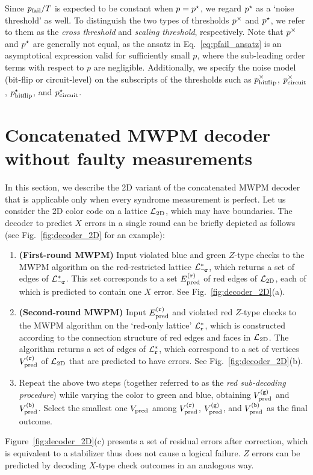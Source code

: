 \documentclass[a4paper,twocolumn,11pt,accepted=2025-01-21]{quantumarticle}
\theoremstyle{definition}
\theoremstyle{definition}
\theoremstyle{definition}
\begin{document}
Since $p_{\mathrm{fail}}/T$ is expected to be constant when $p = p^\star_{\mathrm{}}$, we regard $p^\star_{\mathrm{}}$ as a `noise threshold' as well.
To distinguish the two types of thresholds $p^\times_{\mathrm{}}$ and $p^\star_{\mathrm{}}$, we refer to them as the \emph{cross threshold} and \emph{scaling threshold}, respectively.
Note that $p^\times_{\mathrm{}}$ and $p^\star_{\mathrm{}}$ are generally not equal, as the ansatz in Eq.~\eqref{eq:pfail_ansatz} is an asymptotical expression valid for sufficiently small $p$, where the sub-leading order terms with respect to $p$ are negligible.
Additionally, we specify the noise model (bit-flip or circuit-level) on the subscripts of the thresholds such as $p^\times_{\mathrm{bitflip}}$, $p^\times_{\mathrm{circuit}}$, $p^\star_{\mathrm{bitflip}}$, and $p^\star_{\mathrm{circuit}}$.

\section{Concatenated MWPM decoder without faulty measurements \label{sec:decoder_bit_flip}}

In this section, we describe the 2D variant of the concatenated MWPM decoder that is applicable only when every syndrome measurement is perfect.
Let us consider the 2D color code on a lattice $\mathcal{L}_{\mathrm{2D}}$, which may have boundaries.
The decoder to predict $X$ errors in a single round can be briefly depicted as follows (see Fig.~\ref{fig:decoder_2D} for an example):
\begin{enumerate}
    \item \textbf{(First-round MWPM)} Input violated blue and green $Z$-type checks to the MWPM algorithm on the red-restricted lattice $\mathcal{L}_{\neg \texttt{r}}^*$, which returns a set of edges of $\mathcal{L}_{\neg \texttt{r}}^*$. 
    This set corresponds to a set $E_{\mathrm{pred}}^{(\texttt{r})}$ of red edges of $\mathcal{L}_{\mathrm{2D}}$, each of which is predicted to contain one $X$ error. 
    See Fig.~\ref{fig:decoder_2D}(a).
    \item \textbf{(Second-round MWPM)} Input $E_{\mathrm{pred}}^{(\texttt{r})}$ and violated red $Z$-type checks to the MWPM algorithm on the `red-only lattice' $\mathcal{L}_{\texttt{r}}^*$, which is constructed according to the connection structure of red edges and faces in $\mathcal{L}_{\mathrm{2D}}$.
    The algorithm returns a set of edges of $\mathcal{L}_{\texttt{r}}^*$, which correspond to a set of vertices $V_{\mathrm{pred}}^{(\texttt{r})}$ of $\mathcal{L}_{\mathrm{2D}}$ that are predicted to have errors.
    See Fig.~\ref{fig:decoder_2D}(b).
    \item Repeat the above two steps (together referred to as the \textit{red sub-decoding procedure}) while varying the color to green and blue, obtaining $V_{\mathrm{pred}}^{(\texttt{g})}$ and $V_{\mathrm{pred}}^{(\texttt{b})}$. Select the smallest one $V_{\mathrm{pred}}$ among $V_{\mathrm{pred}}^{(\texttt{r})}$, $V_{\mathrm{pred}}^{(\texttt{g})}$, and $V_{\mathrm{pred}}^{(\texttt{b})}$ as the final outcome.
\end{enumerate}
Figure~\ref{fig:decoder_2D}(c) presents a set of residual errors after correction, which is equivalent to a stabilizer thus does not cause a logical failure.
$Z$ errors can be predicted by decoding $X$-type check outcomes in an analogous way.
\end{document}
